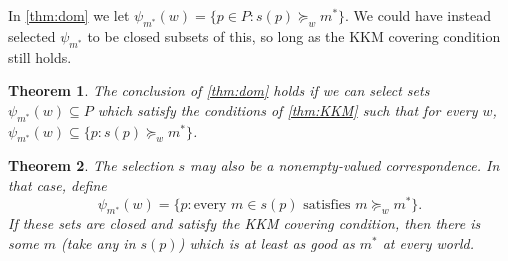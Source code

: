 \documentclass[11pt]{article}
\newtheorem{theorem}{Theorem}[section]
\theoremstyle{definition}
\theoremstyle{remark}
\newcommand{\supp}{\operatorname{supp}}
\newcommand{\given}{\,:\,}
\begin{document}
In \cref{thm:dom} we let $\psi_{m^*}(w)=\{p\in P:s(p)\succeq_w m^*\}$. We could have instead selected $\psi_{m^*}$ to be closed subsets of this, so long as the KKM covering condition still holds. 
\begin{theorem}
	The conclusion of \cref{thm:dom} holds if we can select sets $\psi_{m^*}(w)\subseteq P$ which satisfy the conditions of \cref{thm:KKM} such that for every $w$, $\psi_{m^*}(w)\subseteq\{p: s(p)\succeq_w m^*\}$. 
\end{theorem}

\begin{theorem}
	The selection $s$ may also be a nonempty-valued
	correspondence. In that case, define
	\[
	\psi_{m^*}(w)
	=
	\{p:\text{every }m\in s(p)
	\text{ satisfies }m\succeq_w m^*\}.
	\]
	If these sets are closed and satisfy the KKM covering
	condition, then there is some $m$ (take any in $s(p)$) which is at least as good as $m^*$ at every world.
\end{theorem}

%	
\end{document}
